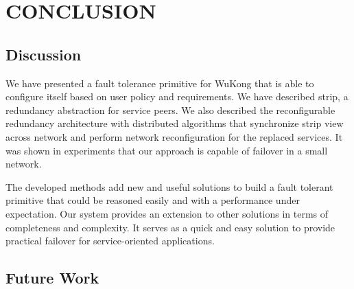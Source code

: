 \cleardoublepage
\singlespacing
\chapter{CONCLUSION}
\label{c:conclusion}
\doublespacing\nointerlineskip


\section{Discussion}

We have presented a fault tolerance primitive for WuKong that is able to
configure itself based on user policy and requirements. We have described strip,
          a redundancy abstraction for service peers. We also described the
          reconfigurable redundancy architecture with distributed algorithms
          that synchronize strip view across network and perform network
          reconfiguration for the replaced services. It was shown in experiments
          that our approach is capable of failover in a small network.

The developed methods add new and useful solutions to build a fault tolerant
primitive that could be reasoned easily and with a performance under
expectation. Our system provides an extension to other solutions in terms of
completeness and complexity. It serves as a quick and easy solution to provide
practical failover for service-oriented applications.



\section{Future Work}

